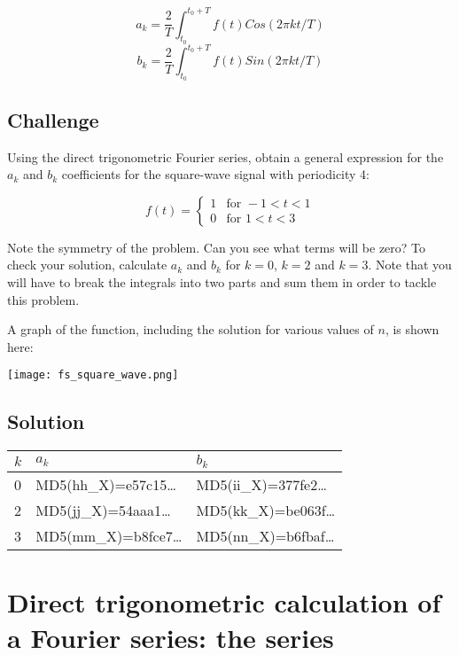 \begin{equation}
    a_k = \frac{2}{T} \int_{t_0}^{t_0+T} f(t) Cos(2 \pi k t/T)
\end{equation}
\begin{equation}
    b_k = \frac{2}{T} \int_{t_0}^{t_0+T} f(t) Sin(2 \pi k t/T)
\end{equation}

\subsection*{Challenge}
Using the direct trigonometric Fourier series, obtain a general expression for the $a_k$ and $b_k$ coefficients for the square-wave signal with periodicity 4:

\begin{equation}
    f(t)=
    \begin{cases}
        1 & \text{for } -1<t<1 \\
        0 & \text{for } 1<t<3
    \end{cases}
\end{equation}

Note the symmetry of the problem. Can you see what terms will be zero? To check your solution, calculate $a_k$ and $b_k$ for $k=0$, $k=2$ and $k=3$. Note that you will have to break the integrals into two parts and sum them in order to tackle this problem.

A graph of the function, including the solution for various values of $n$, is shown here:

\texttt{[image: fs\_square\_wave.png]}

\subsection*{Solution}
\begin{tabular}{|l|l|l|}
    \hline
    $k$ & $a_k$ & $b_k$ \\
    \hline
    0 & MD5(hh\_X)=e57c15\ldots & MD5(ii\_X)=377fe2\ldots \\
    2 & MD5(jj\_X)=54aaa1\ldots & MD5(kk\_X)=be063f\ldots \\
    3 & MD5(mm\_X)=b8fce7\ldots & MD5(nn\_X)=b6fbaf\ldots \\
    \hline
\end{tabular}




\newpage
\section{Direct trigonometric calculation of a Fourier series: the series}

